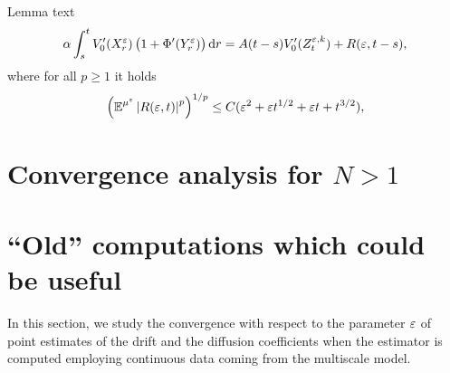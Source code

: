 \documentclass[10pt]{article}
\begin{document}
\begin{lemma} Lemma text
	\begin{equation}
		\alpha \int_s^t V_0'(X^\varepsilon_r)\, \big(1 + \Phi'(Y^\varepsilon_r)\big)\,\mathrm{d} r = A (t - s)V'_0(Z_t^{\varepsilon, k}) + R(\varepsilon, t-s),
	\end{equation}
	where for all $p \geq 1$ it holds
	\begin{equation}
		\left( \operatorname{\mathbb{E}}^{\mu^\varepsilon} \left\lvert R(\varepsilon, t)\right\rvert^p \right)^{1/p} \leq C(\varepsilon^2 + \varepsilon t^{1/2} + \varepsilon t + t^{3/2}),
	\end{equation}
\end{lemma}

\section{Convergence analysis for $N > 1$}

\section{``Old'' computations which could be useful}

In this section, we study the convergence with respect to the parameter $\varepsilon$ of point estimates of the drift and the diffusion coefficients when the estimator is computed employing continuous data coming from the multiscale model.
\end{document}

